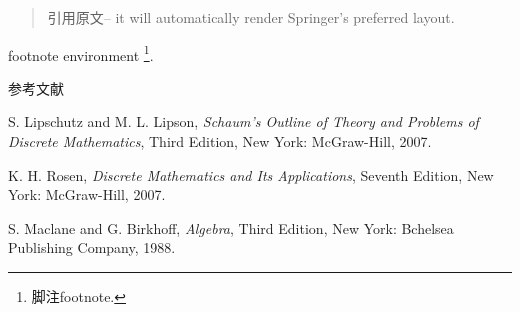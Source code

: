 \begin{quotation}
	引用原文-- it will automatically render Springer's preferred layout.
\end{quotation}

footnote environment \footnote{脚注footnote.}.

参考文献
%

\begin{thebibliography}{99}
	
	
	S. Lipschutz and M. L. Lipson, \textit{Schaum's Outline of Theory and Problems of Discrete Mathematics}, Third Edition, New York: McGraw-Hill, 2007.
	
	K. H. Rosen, \textit{Discrete Mathematics and Its Applications}, Seventh Edition, New York: McGraw-Hill, 2007.
	
	S. Maclane and G. Birkhoff, \textit{Algebra}, Third Edition, New York: Bchelsea Publishing Company, 1988.
\end{thebibliography}
